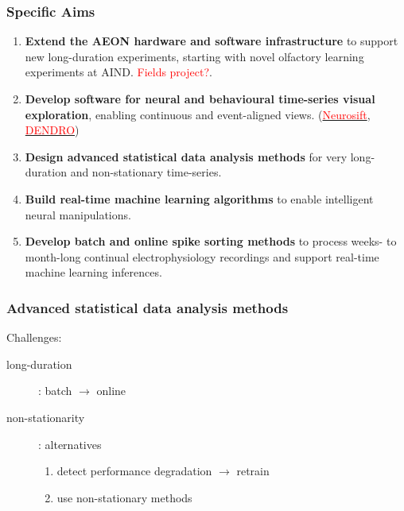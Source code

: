 \documentclass{beamer}
\begin{document}
\begin{frame}
    \frametitle{Specific Aims}

    \begin{enumerate}

        \item \textbf{Extend the AEON hardware and software infrastructure} to
            support new long-duration experiments, starting with novel
            olfactory learning experiments at AIND. \textcolor{red}{Fields
            project?}.

        \item \textbf{Develop software for neural and behavioural time-series
            visual exploration}, enabling continuous and event-aligned views.
            (\href{https://neurosift.app/dandi}{\textcolor{red}{Neurosift}},
            \href{https://github.com/magland/dendro}{\textcolor{red}{DENDRO}})

        \item \textbf{Design advanced statistical data analysis methods} for very
            long-duration and non-stationary time-series.

        \item \textbf{Build real-time machine learning algorithms} to
            enable intelligent neural manipulations.

        \item \textbf{Develop batch and online spike sorting methods} to
            process weeks- to month-long continual electrophysiology recordings
            and support real-time machine learning inferences.

    \end{enumerate}

\end{frame}

\begin{frame}
    \frametitle{Advanced statistical data analysis methods}

    Challenges:

    \begin{description}

        \item[long-duration]: batch $\rightarrow$ online

        \item[non-stationarity]: alternatives

            \begin{enumerate}
                \item detect performance degradation $\rightarrow$ retrain

                \item use non-stationary methods
            \end{enumerate}

    \end{description}

\end{frame}
\end{document}
